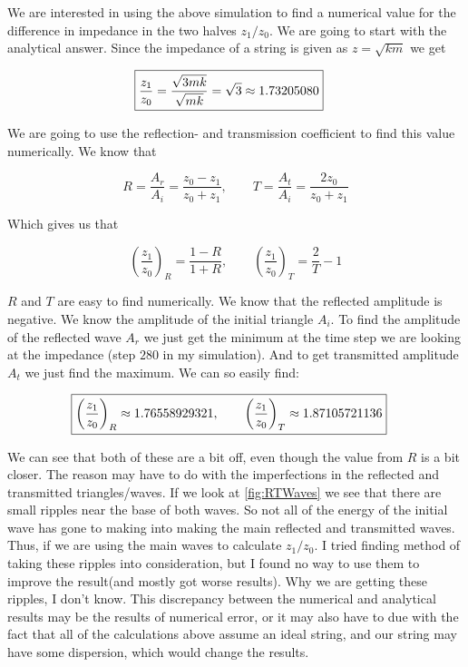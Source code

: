 \documentclass[a4paper,norsk, 10pt]{article}
\begin{document}
We are interested in using the above simulation to find a numerical value for the difference in impedance in the two halves $z_1/z_0$. We are going to start with the analytical answer. Since the impedance of a string is given as $z = \sqrt{km}$ we get

\begin{align}
\Aboxed{
\frac{z_1}{z_0} = \frac{\sqrt{3mk}}{\sqrt{mk}} = \sqrt{3} \approx 1.73205080
}
\end{align}

We are going to use the reflection- and transmission coefficient to find this value numerically. We know that

\begin{equation}
R = \frac{A_r}{A_i} = \frac{z_0 - z_1}{z_0 + z_1}, \qquad T = \frac{A_t}{A_i} = \frac{2z_0}{z_0 + z_1}
\end{equation}

Which gives us that

\begin{equation}
\left(\frac{z_1}{z_0}\right)_R = \frac{1-R}{1+R}, \qquad \left(\frac{z_1}{z_0}\right)_T = \frac{2}{T} - 1
\end{equation}

$R$ and $T$ are easy to find numerically. We know that the reflected amplitude is negative. We know the amplitude of the initial triangle $A_i$. To find the amplitude of the reflected wave $A_r$ we just get the minimum at the time step we are looking at the impedance (step $280$ in my simulation). And to get transmitted amplitude $A_t$ we just find the maximum. We can so easily find:

\begin{align}
\Aboxed{
\left(\frac{z_1}{z_0}\right)_R \approx 1.76558929321, \qquad \left(\frac{z_1}{z_0}\right)_T \approx 1.87105721136
}
\end{align}

We can see that both of these are a bit off, even though the value from $R$ is a bit closer. The reason may have to do with the imperfections in the reflected and transmitted triangles/waves. If we look at \ref{fig:RTWaves} we see that there are small ripples near the base of both waves. So not all of the energy of the initial wave has gone to making into making the main reflected and transmitted waves. Thus, if we are using the main waves to calculate $z_1/z_0$. I tried finding method of taking these ripples into consideration, but I found no way to use them to improve the result(and mostly got worse results). Why we are getting these ripples, I don't know. This discrepancy between the numerical and analytical results may be the results of numerical error, or it may also have to due with the fact that all of the calculations above assume an ideal string, and our string may have some dispersion, which would change the results.
\end{document}
